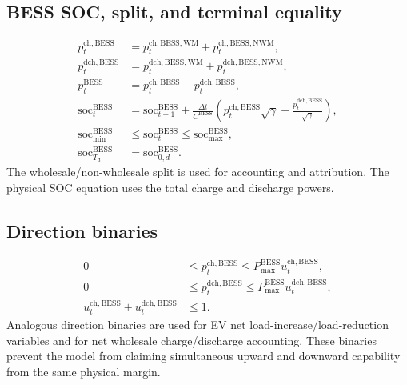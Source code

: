 \documentclass[final,5p,times]{elsarticle}
\newcommand{\DeltaT}{\Delta t}
\newcommand{\BESS}{\mathrm{BESS}}
\newcommand{\soc}{\mathrm{soc}}
\newcommand{\WM}{\mathrm{WM}}
\newcommand{\NWM}{\mathrm{NWM}}
\newcommand{\ch}{\mathrm{ch}}
\newcommand{\dch}{\mathrm{dch}}
\begin{document}
\subsection{BESS SOC, split, and terminal equality}
\begin{align}
p_t^{\ch,\BESS}&=p_t^{\ch,\BESS,\WM}+p_t^{\ch,\BESS,\NWM},\label{eq:app_bess_chsplit}\\
p_t^{\dch,\BESS}&=p_t^{\dch,\BESS,\WM}+p_t^{\dch,\BESS,\NWM},\label{eq:app_bess_dchsplit}\\
p_t^{\BESS}&=p_t^{\ch,\BESS}-p_t^{\dch,\BESS},\label{eq:app_bess_power}\\
\soc_t^{\BESS}&=\soc_{t-1}^{\BESS}+\frac{\DeltaT}{C^{\BESS}}
\left(p_t^{\ch,\BESS}\sqrt{\gamma}-\frac{p_t^{\dch,\BESS}}{\sqrt{\gamma}}\right),\label{eq:app_bess_soc}\\
\soc_{\min}^{\BESS}&\le \soc_t^{\BESS}\le \soc_{\max}^{\BESS},\label{eq:app_bess_bounds}\\
\soc_{T_d}^{\BESS}&=\soc_{0,d}^{\BESS}.\label{eq:app_bess_terminal}
\end{align}
The wholesale/non-wholesale split is used for accounting and attribution. The physical SOC equation uses the total charge and discharge powers.

\subsection{Direction binaries}
\begin{align}
0&\le p_t^{\ch,\BESS}\le P_{\max}^{\BESS}u_t^{\ch,\BESS},\label{eq:app_bess_chbin}\\
0&\le p_t^{\dch,\BESS}\le P_{\max}^{\BESS}u_t^{\dch,\BESS},\label{eq:app_bess_dchbin}\\
u_t^{\ch,\BESS}+u_t^{\dch,\BESS}&\le 1.\label{eq:app_bess_dirbin}
\end{align}
Analogous direction binaries are used for EV net load-increase/load-reduction variables and for net wholesale charge/discharge accounting. These binaries prevent the model from claiming simultaneous upward and downward capability from the same physical margin.
\end{document}
